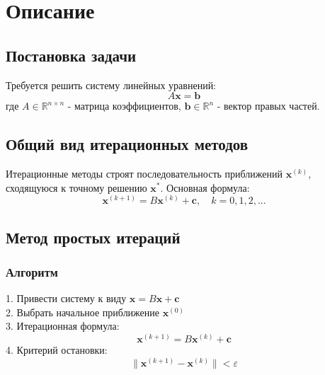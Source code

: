 
\section*{Описание}

\subsection*{Постановка задачи}
Требуется решить систему линейных уравнений:
\begin{equation}
A\mathbf{x} = \mathbf{b}
\end{equation}
где $A \in \mathbb{R}^{n \times n}$ - матрица коэффициентов, $\mathbf{b} \in \mathbb{R}^n$ - вектор правых частей.

\subsection*{Общий вид итерационных методов}
Итерационные методы строят последовательность приближений $\mathbf{x}^{(k)}$, сходящуюся к точному решению $\mathbf{x}^*$. Основная формула:
\begin{equation}
\mathbf{x}^{(k+1)} = B\mathbf{x}^{(k)} + \mathbf{c}, \quad k=0,1,2,...
\end{equation}

\subsection*{Метод простых итераций}

\subsubsection*{Алгоритм}
1. Привести систему к виду $\mathbf{x} = B\mathbf{x} + \mathbf{c}$ \\
2. Выбрать начальное приближение $\mathbf{x}^{(0)}$ \\
3. Итерационная формула:
\begin{equation}
\mathbf{x}^{(k+1)} = B\mathbf{x}^{(k)} + \mathbf{c}
\end{equation}
4. Критерий остановки:
\begin{equation}
\|\mathbf{x}^{(k+1)} - \mathbf{x}^{(k)}\| < \varepsilon
\end{equation}

